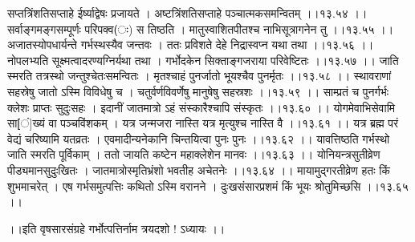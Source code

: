 \documentclass[11pt]{book}
\begin{document}
\begin{landscape}
सप्तत्रिंशतिसप्ताहे ईर्ष्याद्वेषः प्रजायते ।
अष्टत्रिंशतिसप्ताहे पञ्चात्मकसमन्वितम् ।।१३.५४ ।।
सर्वाङ्गमङ्गसम्पूर्णः परिपक्व(ः) स तिष्ठति ।
मातुस्वाशितपीतश्च नाभिसूत्रागनेन तु ।।१३.५५ ।।
अजातस्योपधार्यन्ते गर्भस्थस्यैव जन्तवः ।
ततः प्रविशते देहे निद्रास्वप्न यथा तथा ।।१३.५६ ।।
नोपलभ्यति सूक्ष्मत्वादरण्यग्निर्यथा तथा ।
गर्भोदकेन सिक्ताङ्गजराया परिवेष्टितः ।।१३.५७ ।।
जाति स्मरति तत्रस्थो जन्तुश्चेतःसमन्वितः ।
मृतश्चाहं पुनर्जातो भूयश्चैव पुनर्मृतः ।।१३.५८ ।।
स्थावराणां सहस्रेषु जातो ऽस्मि विविधेषु च ।
चतुर्वर्णविवर्णेषु मानुषेषु सहस्रशः ।।१३.५९ ।।
साम्प्रतं च पुनर्गर्भः क्लेशः प्राप्तः सुदुःसहः ।
इदानीं जातमात्रो ऽहं संस्कारैश्चापि संस्कृतः ।।१३.६० ।।
योगमेवाभिसेवामि सा[ं]ख्यं वा पञ्चविंशकम् ।
यत्र जन्मजरा नास्ति यत्र मृत्युश्च नास्ति वै ।।१३.६१ ।।
यत्र ब्रह्म परं वेद्यं चरिष्यामि यतव्रतः ।
एवमादीन्यनेकानि चिन्तयित्वा पुनः पुनः ।।१३.६२ ।।
यावत्तिष्ठति गर्भस्थो जाति स्मरति पूर्विकाम् ।
ततो जायति कष्टेन महाक्लेशेन मानवः ।।१३.६३ ।।
योनियन्त्रसुतीव्रेण पीड्यमानसुदुःखितः ।
जातमात्रोस्मृतिभ्रंशो भवतीह अचेतनेः ।।१३.६४ ।।
मायामुद्गरतीव्रेण हतः किं शुभमाचरेत् ।
एष गर्भसमुत्पत्तिः कथितो ऽस्मि वरानने ।
दुःखसंसारप्रशमं किं भूयः श्रोतुमिच्छसि ।।१३.६५ ।।

 ।।इति वृषसारसंग्रहे गर्भोत्पत्तिर्नाम त्रयदशो ! ऽध्यायः ।।





\end{landscape}
\end{document}
